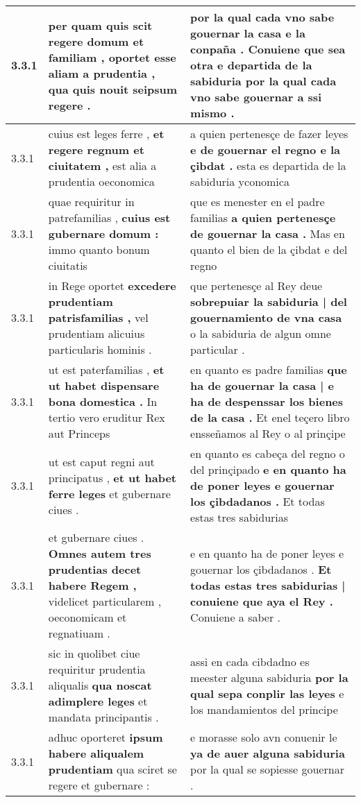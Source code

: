 \begin{tabular}{|p{1cm}|p{6.5cm}|p{6.5cm}|}
3.3.1 & per quam quis scit regere domum et familiam , \textbf{ oportet esse aliam a prudentia , } qua quis nouit seipsum regere . & por la qual cada vno sabe gouernar la casa e la conpaña . \textbf{ Conuiene que sea otra e departida de la sabiduria } por la qual cada vno sabe gouernar a ssi mismo . \\\hline
3.3.1 & cuius est leges ferre , \textbf{ et regere regnum et ciuitatem , } est alia a prudentia oeconomica & a quien pertenesçe de fazer leyes \textbf{ e de gouernar el regno e la çibdat . } esta es departida de la sabiduria yconomica \\\hline
3.3.1 & quae requiritur in patrefamilias , \textbf{ cuius est gubernare domum : } immo quanto bonum ciuitatis & que es menester en el padre familias \textbf{ a quien pertenesçe de gouernar la casa . } Mas en quanto el bien de la çibdat e del regno \\\hline
3.3.1 & in Rege oportet \textbf{ excedere prudentiam patrisfamilias , } vel prudentiam alicuius particularis hominis . & que pertenesçe al Rey deue \textbf{ sobrepuiar la sabiduria | del gouernamiento de vna casa } o la sabiduria de algun omne particular . \\\hline
3.3.1 & ut est paterfamilias , \textbf{ et ut habet dispensare bona domestica . } In tertio vero eruditur Rex aut Princeps & en quanto es padre familias \textbf{ que ha de gouernar la casa | e ha de despenssar los bienes de la casa . } Et enel teçero libro ensseñamos al Rey o al prinçipe \\\hline
3.3.1 & ut est caput regni aut principatus , \textbf{ et ut habet ferre leges } et gubernare ciues . & en quanto es cabeça del regno o del prinçipado \textbf{ e en quanto ha de poner leyes e gouernar los çibdadanos . } Et todas estas tres sabidurias \\\hline
3.3.1 & et gubernare ciues . \textbf{ Omnes autem tres prudentias decet habere Regem , } videlicet particularem , oeconomicam et regnatiuam . & e en quanto ha de poner leyes e gouernar los çibdadanos . \textbf{ Et todas estas tres sabidurias | conuiene que aya el Rey . } Conuiene a saber . \\\hline
3.3.1 & sic in quolibet ciue requiritur prudentia aliqualis \textbf{ qua noscat adimplere leges } et mandata principantis . & assi en cada cibdadno es meester alguna sabiduria \textbf{ por la qual sepa conplir las leyes } e los mandamientos del principe \\\hline
3.3.1 & adhuc oporteret \textbf{ ipsum habere aliqualem prudentiam } qua sciret se regere et gubernare : & e morasse solo avn conuenir le \textbf{ ya de auer alguna sabiduria } por la qual se sopiesse gouernar . \\\hline

\end{tabular}
